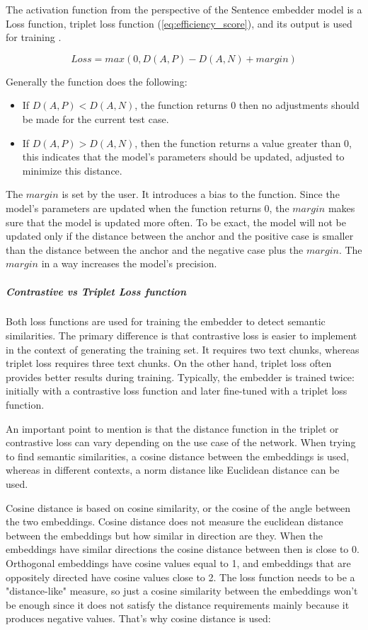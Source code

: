 \documentclass{wseas}
\begin{document}
The activation function from the perspective of the Sentence embedder model is
a Loss function, triplet loss function (\autoref{eq:efficiency_score}), and its output is used for training \cite{sbert}. 

\begin{equation}
  Loss = max(0, D(A,P) - D(A,N) + margin) 
  \label{eq:triplet_loss_function}
\end{equation}

Generally the function does the following:
\begin{itemize}
  \item If \(D(A,P) < D(A,N)\), the function returns 0 then no adjustments should be 
  made for the current test case. 
  \item If \(D(A,P) > D(A,N)\), then the function returns a value greater than 0, this
  indicates that the model's parameters should be updated, adjusted to minimize this distance. 
\end{itemize}

The \(margin\) is set by the user. It introduces a bias to the function. Since the model's parameters 
are updated when the function returns 0, the \(margin\) makes sure that the model is updated more often. 
To be exact, the model will not be updated only if the distance between the anchor and the positive case is smaller
than the distance between the anchor and the negative case plus the \(margin\). The \(margin\) in a way
increases the model's precision.


\subparagraph{Contrastive vs Triplet Loss function}

Both loss functions are used for training the embedder to detect
semantic similarities. The primary difference is that contrastive loss
is easier to implement in the context of generating the training set. It
requires two text chunks, whereas triplet loss requires three text
chunks. On the other hand, triplet loss often provides better results
during training. Typically, the embedder is trained twice: initially
with a contrastive loss function and later fine-tuned with a triplet
loss function.

An important point to mention is that the distance function in the
triplet or contrastive loss can vary depending on the use case of the
network. When trying to find semantic similarities, a cosine distance
between the embeddings is used, whereas in different contexts, a norm
distance like Euclidean distance can be used.

Cosine distance is based on cosine similarity, or the cosine of the
angle between the two embeddings. Cosine distance does not measure the
euclidean distance between the embeddings but how similar in
direction are they. When the embeddings have similar directions the cosine distance
between then is close to 0. Orthogonal embeddings have cosine values equal to 1, 
and embeddings that are oppositely directed have cosine values close to 2. The loss
function needs to be a "distance-like" measure, so just a cosine similarity
between the embeddings won't be enough since it does not satisfy the
distance requirements mainly because it produces negative values. That's why 
cosine distance is used:
\end{document}

